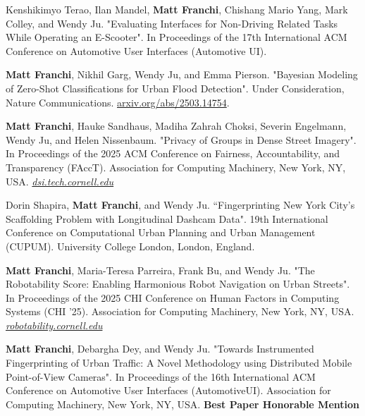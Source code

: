 \documentclass[10pt,letterpaper]{report}
\begin{document}
    \begin{tablist}

        \item[2025.e] \tab{}Kenshikimyo Terao, Ilan Mandel, \textbf{Matt Franchi}, Chishang Mario Yang, Mark Colley, and Wendy Ju. "Evaluating Interfaces for Non-Driving Related Tasks While Operating an E-Scooter". In Proceedings of the 17th International ACM Conference on Automotive User Interfaces (Automotive UI). 

        \item[2025.d] \tab{}\textbf{Matt Franchi}, Nikhil Garg, Wendy Ju, and Emma Pierson. "Bayesian Modeling of Zero-Shot Classifications for Urban Flood Detection". Under Consideration, Nature Communications. \href{https://arxiv.org/abs/2503.14754}{arxiv.org/abs/2503.14754}.

        \item[2025.c] \tab{}\textbf{Matt Franchi}, Hauke Sandhaus, Madiha Zahrah Choksi, Severin Engelmann, Wendy Ju, and Helen Nissenbaum. "Privacy of Groups in Dense Street Imagery". In Proceedings of the 2025 ACM Conference on Fairness, Accountability, and Transparency (FAccT). Association for Computing Machinery, New York, NY, USA.
        \newline\href{https://dsi.tech.cornell.edu}{\textit{dsi.tech.cornell.edu}}

        \item[2025.b] \tab{}Dorin Shapira, \textbf{Matt Franchi}, and Wendy Ju. “Fingerprinting New York City's Scaffolding Problem with Longitudinal Dashcam Data". 19th International Conference on Computational Urban Planning and Urban Management (CUPUM). University College London, London, England. 

        \item[2025.a] \tab{}\textbf{Matt Franchi}, Maria-Teresa Parreira, Frank Bu, and Wendy Ju. "The Robotability Score: Enabling Harmonious Robot Navigation on Urban Streets". In Proceedings of the 2025 CHI Conference on Human Factors in Computing Systems (CHI '25). Association for Computing Machinery, New York, NY, USA. \newline\href{https://robotability.cornell.edu}{\textit{robotability.cornell.edu}}
        \item[\rule{2em}{0.4pt}]
    
        \item[2024.a] \tab{}\textbf{Matt Franchi}, Debargha Dey, and Wendy Ju. "Towards Instrumented Fingerprinting of Urban Traffic: A Novel Methodology using Distributed Mobile Point-of-View Cameras". In Proceedings of the 16th International ACM Conference on Automotive User Interfaces (AutomotiveUI). Association for Computing Machinery, New York, NY, USA. \newline \textbf{Best Paper Honorable Mention} 
    

\end{tablist}
\end{document}
